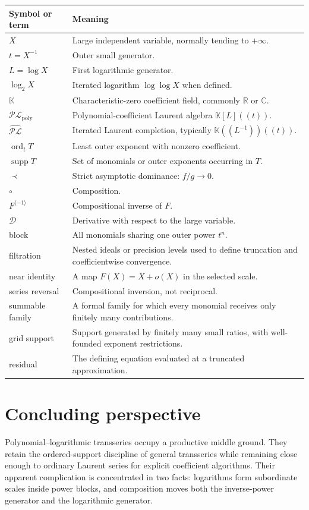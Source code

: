 \documentclass[11pt,oneside]{book}
\theoremstyle{definition}
\theoremstyle{remark}
\DeclareMathOperator{\ord}{ord}
\DeclareMathOperator{\supp}{supp}
\newcommand{\K}{\mathbb K}
\newcommand{\R}{\mathbb R}
\newcommand{\C}{\mathbb C}
\newcommand{\PLpoly}{\mathscr{PL}_{\mathrm{poly}}}
\newcommand{\PLfield}{\widehat{\mathscr{PL}}}
\newcommand{\D}{\mathcal D}
\newcommand{\precdom}{\prec}
\newcommand{\compinv}{^{\langle-1\rangle}}
\newcommand{\compose}{\mathbin{\circ}}
\begin{document}
\begin{longtable}{@{}p{}p{}@{}}
\toprule
Symbol or term&Meaning\\
\midrule
$X$&Large independent variable, normally tending to $+\infty$.\\
$t=X^{-1}$&Outer small generator.\\
$L=\log X$&First logarithmic generator.\\
$\log_2X$&Iterated logarithm $\log\log X$ when defined.\\
$\K$&Characteristic-zero coefficient field, commonly $\R$ or $\C$.\\
$\PLpoly$&Polynomial-coefficient Laurent algebra $\K[L]((t))$.\\
$\PLfield$&Iterated Laurent completion, typically
$\K((L^{-1}))((t))$.\\
$\ord_tT$&Least outer exponent with nonzero coefficient.\\
$\supp T$&Set of monomials or outer exponents occurring in $T$.\\
$\precdom$&Strict asymptotic dominance: $f/g\to0$.\\
$\compose$&Composition.\\
$F\compinv$&Compositional inverse of $F$.\\
$\D$&Derivative with respect to the large variable.\\
block&All monomials sharing one outer power $t^n$.\\
filtration&Nested ideals or precision levels used to define truncation and
coefficientwise convergence.\\
near identity&A map $F(X)=X+o(X)$ in the selected scale.\\
series reversal&Compositional inversion, not reciprocal.\\
summable family&A formal family for which every monomial receives only
finitely many contributions.\\
grid support&Support generated by finitely many small ratios, with
well-founded exponent restrictions.\\
residual&The defining equation evaluated at a truncated approximation.\\
\bottomrule
\end{longtable}

\backmatter

\chapter*{Concluding perspective}
Polynomial--logarithmic transseries occupy a productive middle ground.
They retain the ordered-support discipline of general transseries while
remaining close enough to ordinary Laurent series for explicit
coefficient algorithms. Their apparent complication is concentrated in
two facts: logarithms form subordinate scales inside power blocks, and
composition moves both the inverse-power generator and the logarithmic
generator.
\end{document}
